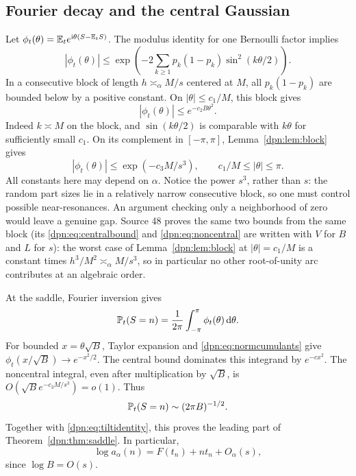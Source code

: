 \documentclass[11pt]{article}
\numberwithin{equation}{section}
\theoremstyle{definition}\newtheorem{definition}[theorem]{Definition}
\theoremstyle{remark}\newtheorem{remark}[theorem]{Remark}
\newcommand{\dd}{\,\mathrm d}\newcommand{\ii}{\mathrm i}
\begin{document}
\subsection{Fourier decay and the central Gaussian}
Let $\phi_t(\theta)=\E_t e^{\ii\theta(S-\E_tS)}$. The modulus identity
for one Bernoulli factor implies
\begin{equation}\label{dpn:eq:phibound}
 |\phi_t(\theta)|\le
 \exp\left(-2\sum_{k\ge1}p_k(1-p_k)\sin^2(k\theta/2)\right).
\end{equation}
In a consecutive block of length $h\asymp_\alpha M/s$ centered at $M$,
all $p_k(1-p_k)$ are bounded below by a positive constant. On
$|\theta|\le c_1/M$, this block gives
\begin{equation}\label{dpn:eq:centralbound}
 |\phi_t(\theta)|\le e^{-c_2 B\theta^2}.
\end{equation}
Indeed $k\asymp M$ on the block, and $\sin(k\theta/2)$ is comparable with
$k\theta$ for sufficiently small $c_1$.
On its complement in $[-\pi,\pi]$, Lemma~\ref{dpn:lem:block} gives
\begin{equation}\label{dpn:eq:noncentral}
 |\phi_t(\theta)|\le
 \exp(-c_3M/s^3),\qquad c_1/M\le|\theta|\le\pi.
\end{equation}
All constants here may depend on $\alpha$. Notice the power $s^3$, rather
than $s$: the random part sizes lie in a relatively narrow consecutive block,
so one must control possible near-resonances. An argument checking only a
neighborhood of zero would leave a genuine gap.  Source 48 proves the same two
bounds from the same block (its \eqref{dpn:eq:centralbound} and
\eqref{dpn:eq:noncentral} are written with $V$ for $B$ and $L$ for $s$): the
worst case of Lemma~\ref{dpn:lem:block} at $|\theta|=c_1/M$ is a constant
times $h^3/M^2\asymp_\alpha M/s^3$, so in particular no other root-of-unity
arc contributes at an algebraic order.

At the saddle, Fourier inversion gives
\[
 \Prob_t(S=n)=\frac1{2\pi}\int_{-\pi}^{\pi}\phi_t(\theta)\dd\theta.
\]
For bounded $x=\theta\sqrt B$, Taylor expansion and
\eqref{dpn:eq:normcumulants} give
$\phi_t(x/\sqrt B)\to e^{-x^2/2}$.
The central bound dominates this integrand by $e^{-c x^2}$.
The noncentral integral, even after multiplication by $\sqrt B$, is
$O(\sqrt B e^{-c_3M/s^3})=o(1)$. Thus
\begin{equation}\label{dpn:eq:llt}
 \mathbb P_t(S=n)\sim(2\pi B)^{-1/2}.
\end{equation}
Together with \eqref{dpn:eq:tiltidentity}, this proves the leading part of
Theorem~\ref{dpn:thm:saddle}. In particular,
\begin{equation}\label{dpn:eq:logsaddle}
 \log a_\alpha(n)=F(t_n)+nt_n+O_\alpha(s),
\end{equation}
since $\log B=O(s)$.
\end{document}
